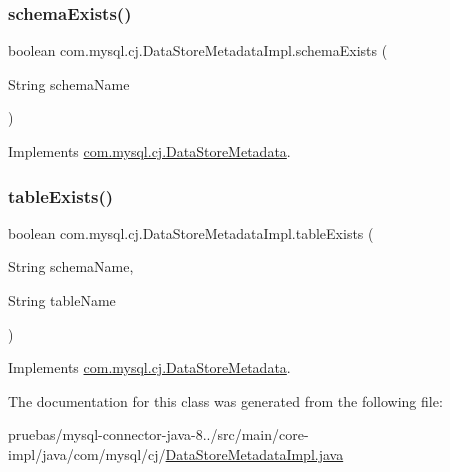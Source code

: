 \subsubsection{\texorpdfstring{schema\+Exists()}{schemaExists()}}
{\footnotesize\ttfamily boolean com.\+mysql.\+cj.\+Data\+Store\+Metadata\+Impl.\+schema\+Exists (\begin{DoxyParamCaption}\item[{String}]{schema\+Name }\end{DoxyParamCaption})}



Implements \mbox{\hyperlink{interfacecom_1_1mysql_1_1cj_1_1_data_store_metadata_a84e051d687ac64b12284d1108299ddd2}{com.\+mysql.\+cj.\+Data\+Store\+Metadata}}.

\mbox{\label{classcom_1_1mysql_1_1cj_1_1_data_store_metadata_impl_a4e68791d006063644a74604988f41c23}} 
\subsubsection{\texorpdfstring{table\+Exists()}{tableExists()}}
{\footnotesize\ttfamily boolean com.\+mysql.\+cj.\+Data\+Store\+Metadata\+Impl.\+table\+Exists (\begin{DoxyParamCaption}\item[{String}]{schema\+Name,  }\item[{String}]{table\+Name }\end{DoxyParamCaption})}



Implements \mbox{\hyperlink{interfacecom_1_1mysql_1_1cj_1_1_data_store_metadata_aa5f40f6700b0a10a53ef81b8481b34be}{com.\+mysql.\+cj.\+Data\+Store\+Metadata}}.



The documentation for this class was generated from the following file\+:\begin{DoxyCompactItemize}
\item 
pruebas/mysql-\/connector-\/java-\/8../src/main/core-\/impl/java/com/mysql/cj/\mbox{\hyperlink{_data_store_metadata_impl_8java}{Data\+Store\+Metadata\+Impl.\+java}}\end{DoxyCompactItemize}
